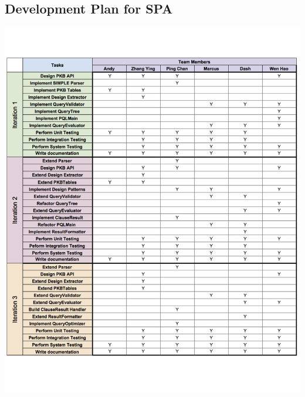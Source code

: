 \documentclass[12pt]{article}
\begin{document}
\subsection{Development Plan for SPA}
\includegraphics[width = 1.2\textwidth,center]{WholePlan.jpg}
\end{document}
